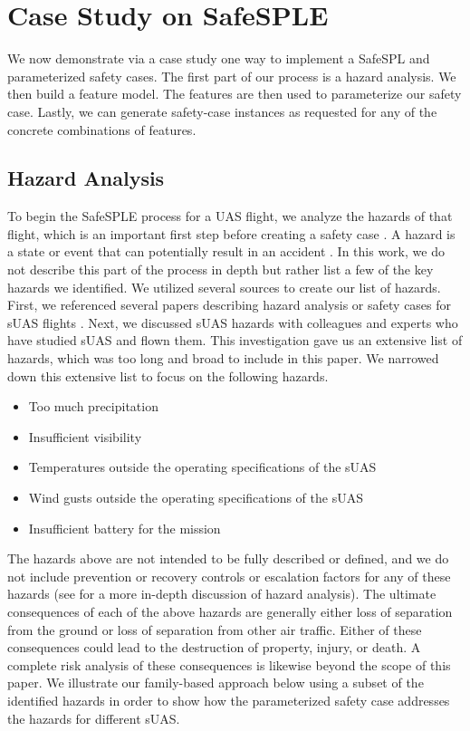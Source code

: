 \section{Case Study on SafeSPLE}
We now demonstrate via a case study one way to implement a SafeSPL and parameterized safety cases.  The first part of our process is a hazard analysis. We then build a feature model. The features are then used to parameterize our safety case. Lastly, we can generate safety-case instances as requested for any of the concrete combinations of features.  

\subsection{Hazard Analysis}
To begin the SafeSPLE process for a UAS flight, we analyze the hazards of that flight, which is an important first step before creating a safety case \cite{Knig12}. A hazard is a state or event that can potentially result in an accident \cite{ericson2015hazard}. In this work, we do not describe this part of the process in depth but rather list a few of the key hazards we identified. We utilized several sources to create our list of hazards. First, we referenced several papers describing hazard analysis or safety cases for sUAS flights \cite{denpai2016, clodenpai2017, sora}. Next, we discussed sUAS hazards with colleagues and experts who have studied sUAS and flown them. This investigation gave us an extensive list of hazards, which was too long and broad to include in this paper. We narrowed down this extensive list to focus on the following hazards. 

\begin{itemize}
    \item Too much precipitation
    \item Insufficient visibility
    \item Temperatures outside the operating specifications of the sUAS
    \item Wind gusts outside the operating specifications of the sUAS
    \item Insufficient battery for the mission
\end{itemize}

The hazards above are not intended to be fully described or defined, and we do not include prevention or recovery controls or escalation factors for any of these hazards (see \cite{denpai2016} for a more in-depth discussion of hazard analysis). The ultimate consequences of each of the above hazards are generally either loss of separation from the ground or loss of separation from other air traffic. Either of these consequences could lead to the destruction of property, injury, or death. A complete risk analysis of these consequences is likewise beyond the scope of this paper. We illustrate our family-based approach below using a subset of the identified hazards in order to show how the parameterized safety case addresses the hazards for different sUAS.       

